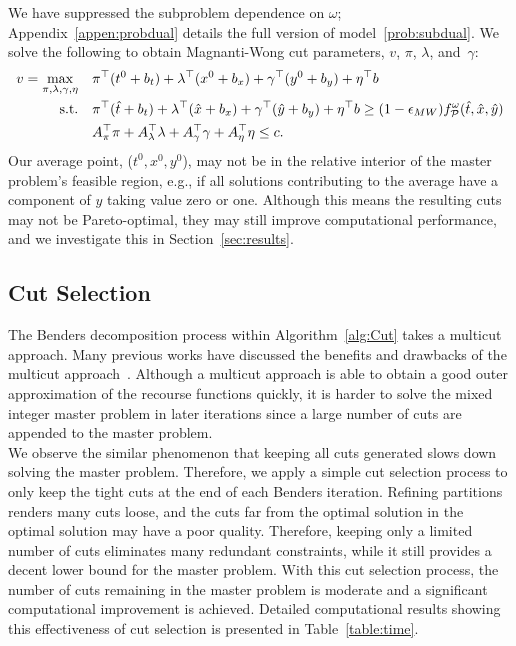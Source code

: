 \documentclass[11pt]{article}
\newcommand{\noi}{\noindent}
\newcommand{\cP}{{\cal P}}
\begin{document}
	We have suppressed the subproblem dependence on $\omega$; Appendix~\ref{appen:probdual} details the full version of model~\eqref{prob:subdual}.
	We solve the following to obtain Magnanti-Wong cut parameters, \({v}\), \(\pi\), \(\lambda\), and~\(\gamma\):
	\begin{subequations} \label{prob:subMW}
		\begin{align}
		{v} = \max_{\pi,\lambda,\gamma,\eta} \quad & \pi^\top (t^0 + b_t) + \lambda^\top (x^0 + b_x) + \gamma^\top (y^0 + b_y) + \eta^\top b  \\
		\text{s.t.} \quad & \pi^\top (\hat{t} + b_t) + \lambda^\top (\hat{x} + b_x) + \gamma^\top (\hat{y} + b_y) + \eta^\top b \geq (1 - \epsilon_{MW}) f^{\omega}_{\cP}(\hat{t},\hat{x},\hat{y}) \\
		& A^\top_{\pi} \pi + A^\top_{\lambda} \lambda + A^\top_{\gamma} \gamma + A^\top_{\eta} \eta \leq c.
		\end{align}
	\end{subequations}
	\noi Our average point, (\(t^0,x^0,y^0\)), may not be in the relative interior of the master problem's feasible region, e.g.,  if all solutions contributing to the average have a component of $y$ taking value zero or one. Although this means the resulting  cuts may not be Pareto-optimal, they may still  improve computational performance, 
	and we investigate this in Section~\ref{sec:results}.
	
	\subsection{Cut Selection}
	The Benders decomposition process within Algorithm~\ref{alg:Cut} takes a multicut approach. Many previous works have discussed the benefits and drawbacks of the multicut approach~\citep{birge2011introduction,trukhanov2010adaptive}. Although a multicut approach is able to obtain a good outer approximation of the recourse functions quickly, it is harder to solve the mixed integer master problem in later iterations since a large number of cuts are appended to the master problem. \\
	\newline
	We observe the similar phenomenon that keeping all cuts generated slows down solving the master problem. Therefore, we apply a simple cut selection process to only keep the tight cuts at the end of each Benders iteration. Refining partitions renders many cuts loose, and the cuts far from the optimal solution in the optimal solution may have a poor quality. Therefore, keeping only a limited number of cuts eliminates many redundant constraints, while it still provides a decent lower bound for the master problem. With this cut selection process, the number of cuts remaining in the master problem is moderate and a significant computational improvement is achieved. Detailed computational results showing this effectiveness of cut selection is presented in Table~\ref{table:time}.
	
\end{document}
